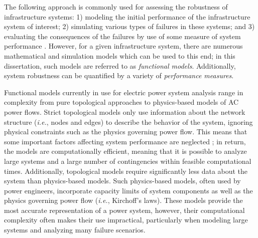 The following approach is commonly used for assessing the robustness of infrastructure systems: 1) modeling the initial performance of the infrastructure system of interest; 2) simulating various types of failures in these systems; and 3) evaluating the consequences of the failures by use of some measure of system performance \cite{Watts1998, Motter2002b, Crucitti2004a, Chassin2005, Holmgren2006a, Wang2009a}.  However, for a given infrastructure system, there are numerous mathematical and simulation models which can be used to this end; in this dissertation, such models are referred to as \emph{functional models}.  Additionally, system robustness can be quantified by a variety of \emph{performance measures}.

Functional models currently in use for electric power system analysis range in complexity from pure topological approaches to physics-based models of AC power flows. Strict topological models only use information about the network structure (\emph{i.e.}, nodes and edges) to describe the behavior of the system, ignoring physical constraints such as the physics governing power flow.  This means that some important factors affecting system performance are neglected \cite{Grubesic2008}; in return, the models are computationally efficient, meaning that it is possible to analyze large systems and a large number of contingencies within feasible computational times. Additionally, topological models require significantly less data about the system than physics-based models.  Such physics-based models, often used by power engineers, incorporate capacity limits of system components as well as the physics governing power flow (\emph{i.e.}, Kirchoff's laws).  These models provide the most accurate representation of a power system, however, their computational complexity often makes their use impractical, particularly when modeling large systems and analyzing many failure scenarios.

